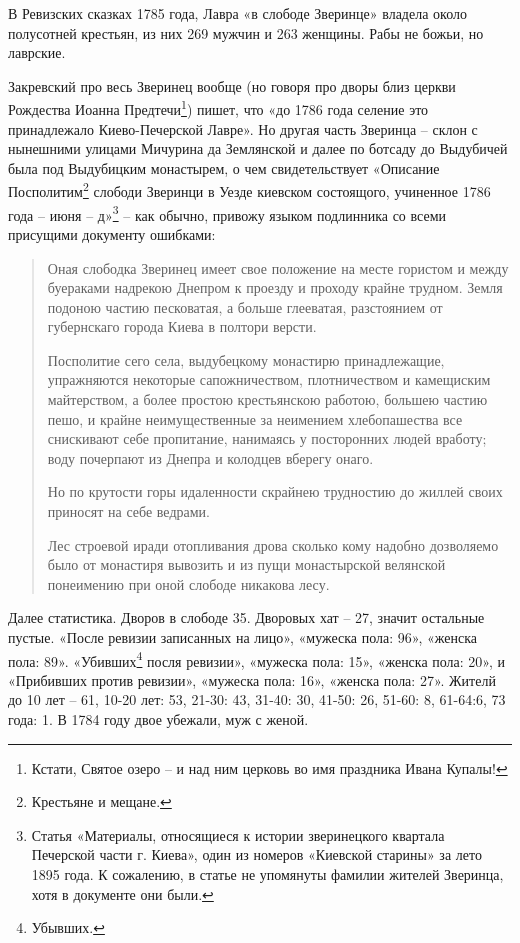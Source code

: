 В Ревизских сказках 1785 года, Лавра «в слободе Зверинце» владела около полусотней крестьян, из них 269 мужчин и 263 женщины. Рабы не божьи, но лаврские.

Закревский про весь Зверинец вообще (но говоря про дворы близ церкви Рождества Иоанна Предтечи\footnote{Кстати, Святое озеро – и над ним церковь во имя праздника Ивана Купалы!}) пишет, что «до 1786 года селение это принадлежало Киево-Печерской Лавре». Но другая часть Зверинца – склон с нынешними улицами Мичурина да Землянской и далее по ботсаду до Выдубичей была под Выдубицким монастырем, о чем свидетельствует «Описание Посполитим\footnote{Крестьяне и мещане.} слободи Зверинци в Уезде киевском состоящого, учиненное 1786 года – июня – д»\footnote{Статья «Материалы, относящиеся к истории зверинецкого квартала Печерской части г. Киева», один из номеров «Киевской старины» за лето 1895 года. К сожалению, в статье не упомянуты фамилии жителей Зверинца, хотя в документе они были.} – как обычно, привожу языком подлинника со всеми присущими документу ошибками:

\begin{quotation}
Оная слободка Зверинец имеет свое положение на месте гористом и между буераками надрекою Днепром к проезду и проходу крайне трудном. Земля подоною частию песковатая, а больше глееватая, разстоянием от губернскаго города Киева в полтори версти. 

Посполитие сего села, выдубецкому монастирю принадлежащие, упражняются некоторые сапожничеством, плотничеством и камещиским майтерством, а более простою крестьянскою работою, большею частию пешо, и крайне неимущественные за неимением хлебопашества все снискивают себе пропитание, нанимаясь у посторонних людей вработу; воду почерпают из Днепра и колодцев вберегу онаго.

Но по крутости горы идаленности скрайнею трудностию до жиллей своих приносят на себе ведрами.

Лес строевой иради отопливания дрова сколько кому надобно дозволяемо было от монастиря вывозить и из пущи монастырской велянской понеимению при оной слободе никакова лесу.
\end{quotation}

Далее статистика. Дворов в слободе 35. Дворовых хат – 27, значит остальные пустые. «После ревизии записанных на лицо», «мужеска пола: 96», «женска пола: 89». «Убивших\footnote{Убывших.} посля ревизии», «мужеска пола: 15», «женска пола: 20», и «Прибивших против ревизии», «мужеска пола: 16», «женска пола: 27». Жителй до 10 лет – 61, 10-20 лет: 53, 21-30: 43, 31-40: 30, 41-50: 26, 51-60: 8, 61-64:6, 73 года: 1. В 1784 году двое убежали, муж с женой.

